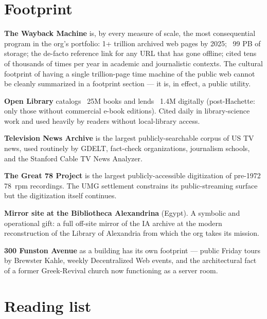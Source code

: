 \documentclass[10pt,letterpaper,twocolumn]{article}
\begin{document}
\section{Footprint}

\textbf{The Wayback Machine} is, by every measure of scale, the most consequential program in the org's portfolio: 1+ trillion archived web pages by 2025; ~99 PB of storage; the de-facto reference link for any URL that has gone offline; cited tens of thousands of times per year in academic and journalistic contexts. The cultural footprint of having a single trillion-page time machine of the public web cannot be cleanly summarized in a footprint section --- it is, in effect, a public utility.

\textbf{Open Library} catalogs ~25M books and lends ~1.4M digitally (post-Hachette: only those without commercial e-book editions). Cited daily in library-science work and used heavily by readers without local-library access.

\textbf{Television News Archive} is the largest publicly-searchable corpus of US TV news, used routinely by GDELT, fact-check organizations, journalism schools, and the Stanford Cable TV News Analyzer.

\textbf{The Great 78 Project} is the largest publicly-accessible digitization of pre-1972 78~rpm recordings. The UMG settlement constrains its public-streaming surface but the digitization itself continues.

\textbf{Mirror site at the Bibliotheca Alexandrina} (Egypt). A symbolic and operational gift: a full off-site mirror of the IA archive at the modern reconstruction of the Library of Alexandria from which the org takes its mission.

\textbf{300 Funston Avenue} as a building has its own footprint --- public Friday tours by Brewster Kahle, weekly Decentralized Web events, and the architectural fact of a former Greek-Revival church now functioning as a server room.

\section{Reading list}
\end{document}
